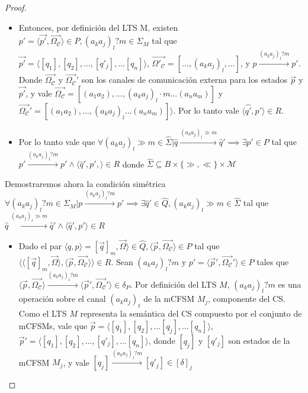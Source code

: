 \begin{proof}
\begin{itemize}
    \item Entonces, por definición del LTS M, existen $p'=\langle \overrightarrow{p'}, \overrightarrow{\Omega_\mathcal{C}} \rangle \in P, (a_ka_j)_l?m \in \Sigma_M$ tal que $\overrightarrow{p'}=\langle [q_1], [q_2], \ldots, [q'_j], \ldots [q_n] \rangle$, $\overrightarrow{\Omega'_\mathcal{C}}=[\ldots, (a_ka_j)_l, \ldots]$, y $p \xrightarrow{(a_ka_j)_l?m} p'$. Donde $\overrightarrow{\Omega_\mathcal{C}}$ y $\overrightarrow{\Omega_\mathcal{C}}'$ son los canales de comunicación externa para los estados $\overrightarrow{p}$ y $\overrightarrow{p'}$, y vale $\overrightarrow{\Omega_\mathcal{C}} = [(a_1a_2), \ldots, (a_ka_j)_l \cdot m \ldots (a_na_m)]$ y $\overrightarrow{\Omega_\mathcal{C}}' = [(a_1a_2), \ldots, (a_ka_j)_l \ldots (a_na_m)] \rangle$. Por lo tanto vale $\langle \widehat{q'}, p' \rangle \in R$.
    
    \item Por lo tanto vale que $\forall (a_ka_j)_l \gg m \in \widehat{\Sigma} | \widehat{q} \xrightarrow{(a_ka_j)_l \gg m} \widehat{q}' \implies \exists p' \in P$ tal que $p' \xrightarrow{(a_ka_j)_l?m} p' \land \langle \widehat{q}', p', \rangle \in R$ donde $\widehat{\Sigma} \subseteq B \times \{\gg,\ll\} \times \mathcal{M}$
  \end{itemize}
  
  Demostraremos ahora la condición simétrica $\forall (a_ka_j)_l?m \in \Sigma_M | p \xrightarrow{(a_ka_j)_l?m} p' \implies \exists \widehat{q}' \in \widehat{Q}, (a_ka_j)_l \gg m \in \widehat{\Sigma}$ tal que $\widehat{q} \xrightarrow{(a_ka_j)_l \gg m} \widehat{q}' \land \langle \widehat{q}', p'\rangle \in R$ 
  \begin{itemize}

     \item Dado el par $\langle q, p \rangle = [\overrightarrow{q}]_m, \overrightarrow{\Omega} \rangle \in \widehat{Q}, \langle \overrightarrow{p}, \overrightarrow{\Omega_\mathcal{C}} \rangle \in P$ tal que $\langle \langle [\overrightarrow{q}]_m, \overrightarrow{\Omega} \rangle, \langle \overrightarrow{p}, \overrightarrow{\Omega_\mathcal{C}} \rangle \rangle \in R$. Sean $(a_ka_j)_l?m$ y $p' = \langle \overrightarrow{p}', \overrightarrow{\Omega_\mathcal{C}}' \rangle \in P$ tales que $\langle \overrightarrow{p}, \overrightarrow{\Omega_\mathcal{C}} \rangle \xrightarrow{(a_ka_j)_l?m} \langle \overrightarrow{p}', \overrightarrow{\Omega_\mathcal{C}}' \rangle \in \delta_P$. Por definición del LTS $M$, $(a_ka_j)_l?m$ es una operación sobre el canal $(a_ka_j)_t$ de la mCFSM $M_j$, componente del CS. Como el LTS $M$ representa la semántica del CS compuesto por el conjunto de mCFSMs, vale que $\overrightarrow{p}=\langle [q_1], [q_2], \ldots [q_j], \ldots [q_n] \rangle$, $\overrightarrow{p}'= \langle [q_1], [q_2], \ldots, [q'_j], \ldots [q_n] \rangle$, donde $[q_j]$ y $[q'_j]$ son estados de la mCFSM $M_j$, y vale $[q_j] \xrightarrow{(a_ka_j)_l?m} [q'_j] \in [\delta]_j$
    

\end{itemize}
\end{proof}
